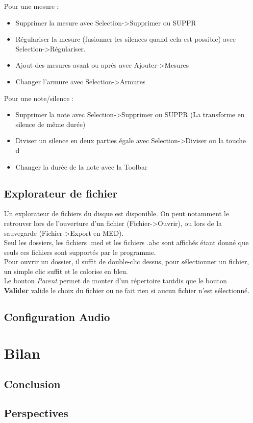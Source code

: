 \documentclass[12pt]{report}
\begin{document}
Pour une mesure : \\
\begin{itemize}
 \item Supprimer la mesure avec Selection->Supprimer ou SUPPR\\
 \item Régulariser la mesure (fusionner les silences quand cela est possible) avec Selection->Régulariser.\\
 \item Ajout des mesures avant ou après avec Ajouter->Mesures\\
 \item Changer l'armure avec Selection->Armures\\
\end{itemize}
\vskip 0.2in
Pour une note/silence : \\
\begin{itemize}
 \item Supprimer la note avec Selection->Supprimer ou SUPPR (La transforme en silence de même durée)\\
 \item Diviser un silence en deux parties égale avec Selection->Diviser ou la touche d\\
 \item Changer la durée de la note avec la Toolbar\\
\end{itemize}
\vskip 0.2in

\section{Explorateur de fichier}
Un explorateur de fichiers du disque est disponible. On peut notamment le retrouver lors de l'ouverture d'un fichier (Fichier->Ouvrir), ou lors de la sauvegarde (Fichier->Export en MED).\\
Seul les dossiers, les fichiers .med et les fichiers .abc sont affichés étant donné que seuls ces fichiers sont supportés par le programme.\\
Pour ouvrir un dossier, il suffit de double-clic dessus, pour sélectionner un fichier, un simple clic suffit et le colorise en bleu.\\
Le bouton \textit{Parent} permet de monter d'un répertoire tantdis que le bouton \textbf{Valider} valide le choix du fichier ou ne fait rien si aucun fichier n'est sélectionné.\\
\section{Configuration Audio}

\chapter{Bilan}
\section{Conclusion}
\section{Perspectives} %
\end{document}
